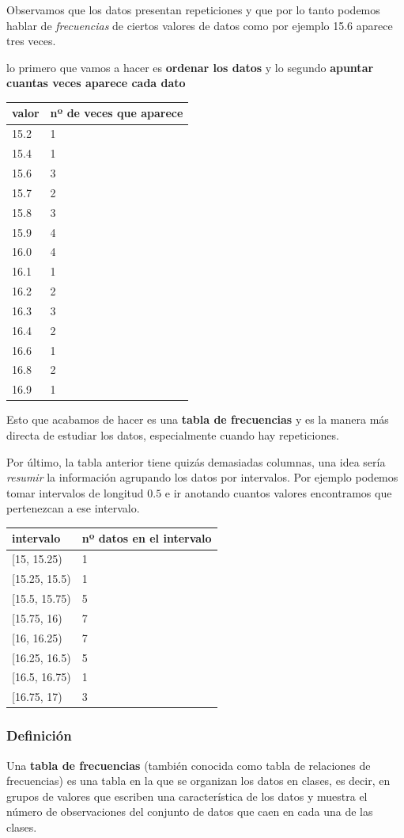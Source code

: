 \documentclass[
]{article}
\begin{document}
Observamos que los datos presentan repeticiones y que por lo tanto
podemos hablar de \emph{frecuencias} de ciertos valores de datos como
por ejemplo 15.6 aparece tres veces.

lo primero que vamos a hacer es \textbf{ordenar los datos} y lo segundo
\textbf{apuntar cuantas veces aparece cada dato}

\begin{longtable}[]{@{}ll@{}}
\toprule
valor & nº de veces que aparece\tabularnewline
\midrule
\endhead
15.2 & 1\tabularnewline
15.4 & 1\tabularnewline
15.6 & 3\tabularnewline
15.7 & 2\tabularnewline
15.8 & 3\tabularnewline
15.9 & 4\tabularnewline
16.0 & 4\tabularnewline
16.1 & 1\tabularnewline
16.2 & 2\tabularnewline
16.3 & 3\tabularnewline
16.4 & 2\tabularnewline
16.6 & 1\tabularnewline
16.8 & 2\tabularnewline
16.9 & 1\tabularnewline
\bottomrule
\end{longtable}

Esto que acabamos de hacer es una \textbf{tabla de frecuencias} y es la
manera más directa de estudiar los datos, especialmente cuando hay
repeticiones.

Por último, la tabla anterior tiene quizás demasiadas columnas, una idea
sería \emph{resumir} la información agrupando los datos por intervalos.
Por ejemplo podemos tomar intervalos de longitud \(0.5\) e ir anotando
cuantos valores encontramos que pertenezcan a ese intervalo.

\begin{longtable}[]{@{}ll@{}}
\toprule
intervalo & nº datos en el intervalo\tabularnewline
\midrule
\endhead
{[}15, 15.25) & 1\tabularnewline
{[}15.25, 15.5) & 1\tabularnewline
{[}15.5, 15.75) & 5\tabularnewline
{[}15.75, 16) & 7\tabularnewline
{[}16, 16.25) & 7\tabularnewline
{[}16.25, 16.5) & 5\tabularnewline
{[}16.5, 16.75) & 1\tabularnewline
{[}16.75, 17) & 3\tabularnewline
\bottomrule
\end{longtable}

\hypertarget{definiciuxf3n}{%
\subsubsection{Definición}\label{definiciuxf3n}}

Una \textbf{tabla de frecuencias} (también conocida como tabla de
relaciones de frecuencias) es una tabla en la que se organizan los datos
en clases, es decir, en grupos de valores que escriben una
característica de los datos y muestra el número de observaciones del
conjunto de datos que caen en cada una de las clases.
\end{document}
